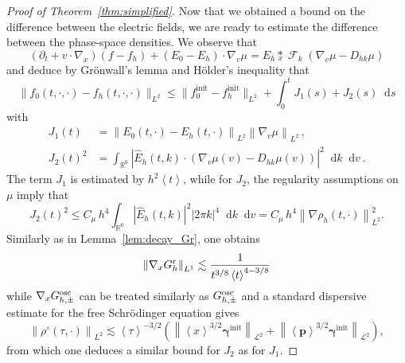 \documentclass[a4paper,12pt]{amsart} %
\theoremstyle{plain}
\theoremstyle{definition}
\newcommand		{\RR}		{\mathbb R}			%
\newcommand		{\R}		{\RR}
\newcommand		{\Rdd}		{\R^6}
\renewcommand	{\L}		{\mathcal L}		%
\newcommand		{\lt}			{\left}				%
\newcommand		{\rt}			{\right}			%
\renewcommand	{\(}			{\lt(}
\renewcommand	{\)}			{\rt)}
\newcommand		{\bangle}[1]	{\lt\langle #1\rt\rangle}
\newcommand		{\weight}[1]	{\bangle{#1}}	%
\newcommand		{\n}[1]			{\lt\lvert{#1}\rt\rvert}	%
\newcommand		{\nrm}[1]		{\lt\lVert{#1}\rt\rVert}		%
\newcommand		{\snrm}[1]		{\lVert #1\rVert}
\newcommand		{\Nrm}[2]		{\nrm{#1}_{#2}}
\newcommand		{\sNrm}[2]		{\snrm{#1}_{#2}}
\renewcommand		{\d}		{\mathop{}\!\mathrm{d}}		%
\newcommand			{\dpt}		{\partial_t}
\newcommand			{\Dx}		{\nabla_x}
\newcommand			{\Dv}		{\nabla_v}
\DeclareMathOperator{\cF}		{\mathcal{F}}		%
\newcommand		{\intdd}		{\int_{\Rdd}}
\newcommand		{\init}			{\mathrm{init}}
\newcommand	{\h}			{h}
\newcommand		{\opgam}		{{\boldsymbol{\gamma}}}
\newcommand		{\op}			{\opgam}	%
\newcommand		{\opp}			{\boldsymbol{p}}
\newcommand		{\Gr}			{G^{\textnormal{r}}}
\newcommand		{\Gosc}			{G^{\textnormal{osc}}}
\begin{document}
\begin{proof}[Proof of Theorem~\ref{thm:simplified}]
		Now that we obtained a bound on the difference between the electric fields, we are ready to estimate the difference between the phase-space densities. We observe that
		\begin{equation*}
			(\dpt + v\cdot\Dx)(f-f_\h) + (E_0 -E_h) \cdot\Dv\mu = E_\h \underset{x}{*} \cF_k\lt( \Dv\mu - D_{h k}\mu\rt)
		\end{equation*}
		and deduce by Gr\"onwall's lemma and H\"older's inequality that
		\begin{equation*}
			\sNrm{f_0(t,\cdot,\cdot)-f_\h(t,\cdot,\cdot)}{L^2} \leq \sNrm{f_0^\init-f_\h^\init}{L^2} + \int_0^t J_1(s) + J_2(s) \d s
		\end{equation*}
		with
		\begin{align*}
			J_1(t) &= \Nrm{E_0(t,\cdot)-E_\h(t,\cdot)}{L^2} \Nrm{\Dv\mu}{L^2} \, ,
			\\
			J_2(t)^2 &= \intdd \n{\widehat{E}_\h(t,k) \cdot\lt(\Dv\mu(v) - D_{h k}\mu(v)\rt)}^2\d k\d v \, .
		\end{align*}
		The term $J_1$ is estimated by $\h^2\weight{t}$, while for $J_2$, the regularity assumptions on $\mu$ imply that 
		\begin{equation*}
			J_2(t)^2 \leq C_\mu\,h^4 \intdd \n{\widehat{E}_\h(t,k)}^2 \n{2\pi k}^4 \d k\d v = C_\mu\,h^4 \Nrm{\nabla\rho_\h(t,\cdot)}{L^2}^2 .
		\end{equation*}
        Similarly as in Lemma~\ref{lem:decay_Gr}, one obtains
        \begin{equation*}
            \Nrm{\Dx \Gr_\h}{L^1} \lesssim \frac{1}{t^{3/8}\weight{t}^{4-3/8}}
        \end{equation*}
        while $\Dx\Gosc_{\h,\pm}$ can be treated similarly as $\Gosc_{\h,\pm}$ 
        and a standard dispersive estimate for the free Schrödinger equation gives
        \begin{equation*}
			\Nrm{\rho^\circ(\tau,\cdot)}{L^2} \lesssim \weight{\tau}^{-3/2} \lt(\Nrm{\weight{x}^{3/2}\op^\init}{\L^2} + \Nrm{\weight{\opp}^{3/2}\op^\init}{\L^2}\rt) ,
		\end{equation*}
        from which one deduces a similar bound for $J_2$ as for $J_1$.
	\end{proof}
\end{document}
